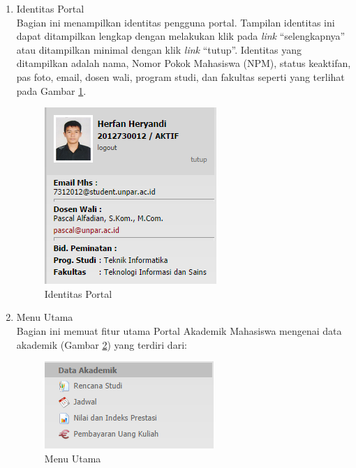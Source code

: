 \begin{enumerate}
	\item Identitas Portal \\
	Bagian ini menampilkan identitas pengguna portal. Tampilan identitas ini dapat ditampilkan lengkap dengan melakukan klik pada \textit{link} ``selengkapnya'' atau ditampilkan minimal dengan klik \textit{link} ``tutup''. Identitas yang ditampilkan adalah nama, Nomor Pokok Mahasiswa (NPM), status keaktifan, pas foto, email, dosen wali, program studi, dan fakultas seperti yang terlihat pada Gambar \ref{fig:3_pam_identitas}.   
	\begin{figure}[H]
			\centering
			\includegraphics[scale=0.75]{Gambar/pam-identitas}
			\caption{Identitas Portal} 
			\label{fig:3_pam_identitas}
		\end{figure}
		
	\item Menu Utama\\
	Bagian ini memuat fitur utama Portal Akademik Mahasiswa mengenai data akademik (Gambar \ref{fig:3_pam_utama}) yang terdiri dari:
		\begin{figure}[H]
			\centering
			\includegraphics[scale=0.75]{Gambar/pam-utama}
			\caption{Menu Utama} 
			\label{fig:3_pam_utama}
		\end{figure}
	\begin{itemize}
	

\end{itemize}
\end{enumerate}
